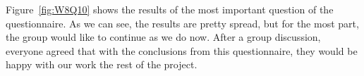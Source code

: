 Figure~\ref{fig:W8Q10} shows the results of the most important question of the questionnaire. As we can see, the results are pretty spread, but for the most part, the group would like to continue as we do now. After a group discussion, everyone agreed that with the conclusions from this questionnaire, they would be happy with our work the rest of the project. 
